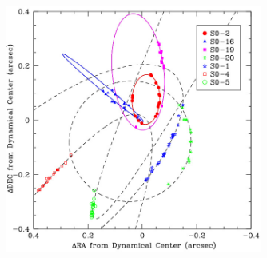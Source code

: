 \documentclass[solutions]{esg8012pset}
\begin{document}
\begin{solution}
    \begin{figure}[!h] \label{fig:orbits}
      \begin{center}\includegraphics[width=0.75\textwidth]{ps10_4}\end{center}
    \end{figure}


\end{solution}
\end{document}

